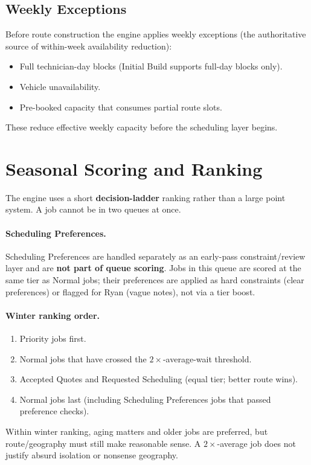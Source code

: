 \documentclass[12pt]{article}
\begin{document}
\subsection*{Weekly Exceptions}
Before route construction the engine applies weekly exceptions (the authoritative source of within-week availability reduction):
\begin{itemize}
    \item Full technician-day blocks (Initial Build supports full-day blocks only).
    \item Vehicle unavailability.
    \item Pre-booked capacity that consumes partial route slots.
\end{itemize}
These reduce effective weekly capacity before the scheduling layer begins.

\section*{Seasonal Scoring and Ranking}
\label{sec:scoring_model}

The engine uses a short \textbf{decision-ladder} ranking rather than a large point system.
A job cannot be in two queues at once.

\paragraph{Scheduling Preferences.}
Scheduling Preferences are handled separately as an early-pass constraint/review layer and are \textbf{not part of queue scoring}.
Jobs in this queue are scored at the same tier as Normal jobs; their preferences are applied as hard constraints (clear preferences) or flagged for Ryan (vague notes), not via a tier boost.

\paragraph{Winter ranking order.}
\begin{enumerate}
    \item Priority jobs first.
    \item Normal jobs that have crossed the $2\times$-average-wait threshold.
    \item Accepted Quotes and Requested Scheduling (equal tier; better route wins).
    \item Normal jobs last (including Scheduling Preferences jobs that passed preference checks).
\end{enumerate}
Within winter ranking, aging matters and older jobs are preferred, but route/geography must still make reasonable sense.
A $2\times$-average job does not justify absurd isolation or nonsense geography.
\end{document}
